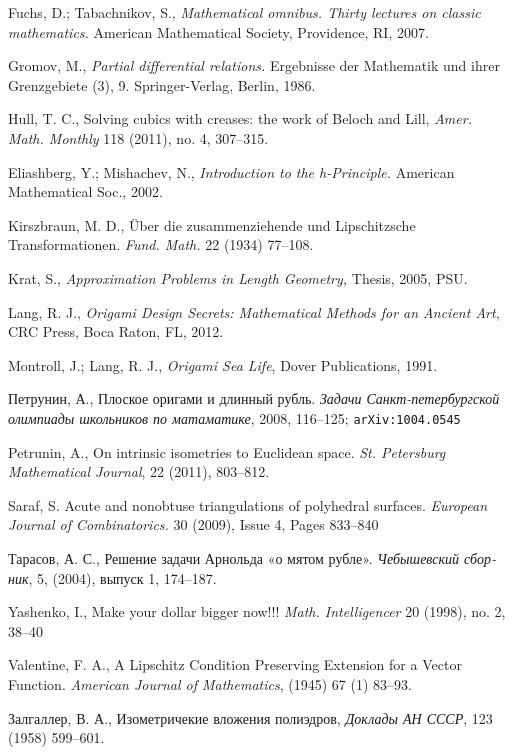 \begin{thebibliography}{52}
Fuchs, D.; 
Tabachnikov, S.,
\textit{Mathematical omnibus.
Thirty lectures on classic mathematics.} 
American Mathematical Society, Providence, RI, 2007. 


  Gromov, M., 
\textit{Partial differential relations.} 
Ergebnisse der Mathematik und ihrer Grenzgebiete (3), 9. 
Springer-Verlag, Berlin, 1986.

 Hull, T. C.,
Solving cubics with creases: the work of Beloch and Lill, 
\textit{Amer. Math. Monthly} 118 (2011), no. 4, 307--315.

 Eliashberg, Y.;  Mishachev, N., \textit{Introduction to the \textit{h}-Principle.} 
American Mathematical Soc., 2002.

 Kirszbraun, M. D., 
\"Uber die zusammenziehende und Lipschitzsche Transformationen. 
\textit{Fund. Math.} 22 (1934) 77--108.

 Krat, S., 
\textit{Approximation Problems in Length Geometry,} 
Thesis, 2005, PSU.

 Lang, R. J., 
\textit{Origami Design Secrets: Mathematical Methods for an Ancient Art},
CRC Press, Boca Raton, FL, 2012.


Montroll, J.;  
Lang, R. J., 
\textit{Origami Sea Life},
Dover Publications, 1991.

\begin{otherlanguage}{russian}
Петрунин, А., 
Плоское оригами и длинный рубль.
\textit{Задачи Санкт-петербургской олимпиады школьников по матаматике}, 2008, 116--125; \texttt{arXiv:1004.0545}
\end{otherlanguage}

 Petrunin, A.,
On intrinsic isometries to Euclidean space.
\textit{St. Petersburg Mathematical Journal}, 22 (2011), 803--812.

  Saraf, S. 
Acute and nonobtuse triangulations of polyhedral surfaces.
\textit{European Journal of Combinatorics.} 
30 (2009), Issue 4, Pages 833--840

\begin{otherlanguage}{russian}
Тарасов, А. С.,
Решение задачи Арнольда «о мятом рубле».
\textit{Чебышевский сборник},  
5, (2004), выпуск 1, 174--187.
\end{otherlanguage}

 Yashenko, I.,
Make your dollar bigger now!!! 
\textit{Math. Intelligencer} 20 (1998), no. 2, 38--40

 Valentine, F. A.,  
A Lipschitz Condition Preserving Extension for a Vector Function. \textit{American Journal of Mathematics}, (1945) 67 (1) 83--93.


\begin{otherlanguage}{russian}
Залгаллер, В. А.,
Изометричекие вложения полиэдров,
\textit{Доклады АН СССР},
123 (1958) 599--601.
\end{otherlanguage}

\end{thebibliography}
